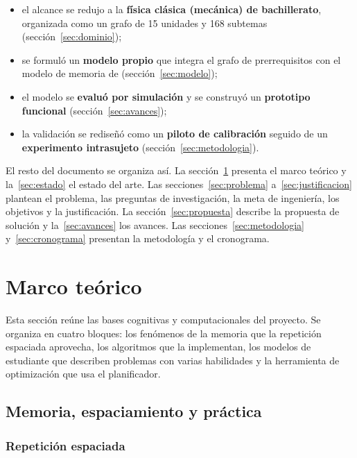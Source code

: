 \documentclass[12pt]{article}
\theoremstyle{definition}
\begin{document}
\begin{itemize}
\item el alcance se redujo a la \textbf{física clásica (mecánica) de bachillerato}, organizada como un grafo de 15 unidades y 168 subtemas (sección~\ref{sec:dominio});
\item se formuló un \textbf{modelo propio} que integra el grafo de prerrequisitos con el modelo de memoria de \citet{tabibian2019} (sección~\ref{sec:modelo});
\item el modelo se \textbf{evaluó por simulación} y se construyó un \textbf{prototipo funcional} (sección~\ref{sec:avances});
\item la validación se rediseñó como un \textbf{piloto de calibración} seguido de un \textbf{experimento intrasujeto} (sección~\ref{sec:metodologia}).
\end{itemize}

El resto del documento se organiza así. La sección~\ref{sec:marco} presenta el marco teórico y la~\ref{sec:estado} el estado del arte. Las secciones~\ref{sec:problema} a~\ref{sec:justificacion} plantean el problema, las preguntas de investigación, la meta de ingeniería, los objetivos y la justificación. La sección~\ref{sec:propuesta} describe la propuesta de solución y la~\ref{sec:avances} los avances. Las secciones~\ref{sec:metodologia} y~\ref{sec:cronograma} presentan la metodología y el cronograma.

\section{Marco teórico}
\label{sec:marco}

Esta sección reúne las bases cognitivas y computacionales del proyecto. Se organiza en cuatro bloques: los fenómenos de la memoria que la repetición espaciada aprovecha, los algoritmos que la implementan, los modelos de estudiante que describen problemas con varias habilidades y la herramienta de optimización que usa el planificador.

\subsection{Memoria, espaciamiento y práctica}

\subsubsection{Repetición espaciada}
\end{document}

